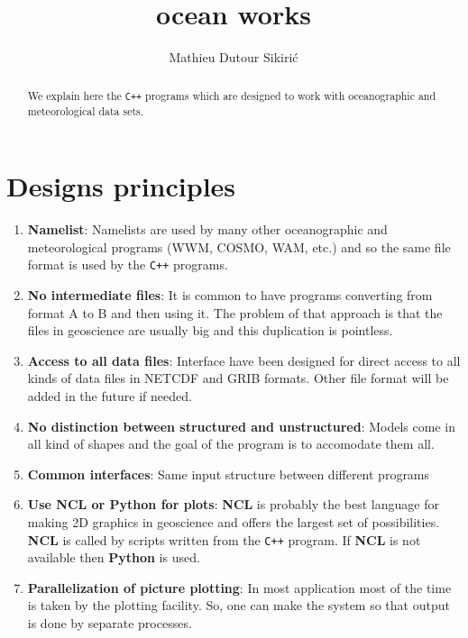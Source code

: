 \documentclass[12pt]{amsart}
\begin{document}
\author{Mathieu Dutour Sikiri\'c}
\address{Mathieu Dutour Sikiri\'c, Rudjer Boskovi\'c Institute, Bijenicka 54, 10000 Zagreb, Croatia, Fax: +385-1-468-0245}







\title{ocean works}


\maketitle

\begin{abstract}
We explain here the {\tt C++} programs which are designed to work with oceanographic and meteorological data sets.
\end{abstract}

\section{Designs principles}

\begin{enumerate}
\item {\bf Namelist}: Namelists are used by many other oceanographic and meteorological programs (WWM, COSMO, WAM, etc.) and so the same file format is used by the {\tt C++} programs.
\item {\bf No intermediate files}: It is common to have programs converting from format A to B and then using it. The problem of that approach is that the files in geoscience are usually big and this duplication is pointless.
\item {\bf Access to all data files}: Interface have been designed for direct access to all kinds of data files in NETCDF and GRIB formats. Other file format will be added in the future if needed.
\item {\bf No distinction between structured and unstructured}: Models come in all kind of shapes and the goal of the program is to accomodate them all.
\item {\bf Common interfaces}: Same input structure between different programs
\item {\bf Use NCL or Python for plots}: {\bf NCL} is probably the best language for making 2D graphics in geoscience and offers the largest set of possibilities. {\bf NCL} is called by scripts written from the {\tt C++} program. If {\bf NCL} is not available then {\bf Python} is used.
\item {\bf Parallelization of picture plotting}: In most application most of the time is taken by the plotting facility. So, one can make the system so that output is done by separate processes.
\end{enumerate}
\end{document}
